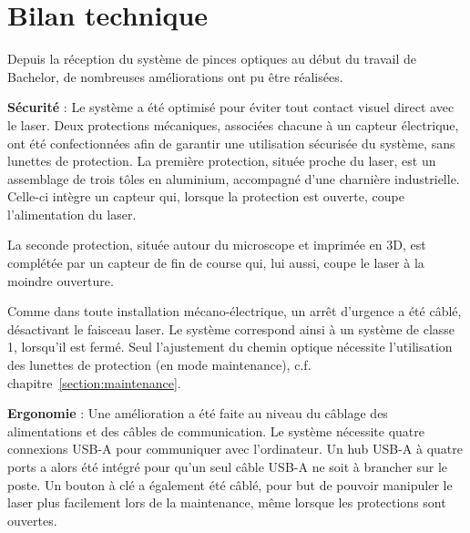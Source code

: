 

\section*{Bilan technique}
Depuis la réception du système de pinces optiques au début du travail de Bachelor, de nombreuses améliorations ont pu être réalisées.

\textbf{Sécurité} :
Le système a été optimisé pour éviter tout contact visuel direct avec le laser. Deux protections mécaniques, associées chacune à un capteur électrique, ont été confectionnées afin de garantir une utilisation sécurisée du système, sans lunettes de protection. La première protection, située proche du laser, est un assemblage de trois tôles en aluminium, accompagné d'une charnière industrielle. Celle-ci intègre un capteur qui, lorsque la protection est ouverte, coupe l'alimentation du laser.

La seconde protection, située autour du microscope et imprimée en 3D, est complétée par un capteur de fin de course qui, lui aussi, coupe le laser à la moindre ouverture.

Comme dans toute installation mécano-électrique, un arrêt d'urgence a été câblé, désactivant le faisceau laser. Le système correspond ainsi à un système de classe 1, lorsqu'il est fermé. Seul l'ajustement du chemin optique nécessite l'utilisation des lunettes de protection (en mode maintenance), c.f. chapitre~\ref{section:maintenance}.

\textbf{Ergonomie} :
Une amélioration a été faite au niveau du câblage des alimentations et des câbles de communication. Le système nécessite quatre connexions USB-A pour communiquer avec l'ordinateur. Un hub USB-A à quatre ports a alors été intégré pour qu'un seul câble USB-A ne soit à brancher sur le poste. Un bouton à clé a également été câblé, pour but de pouvoir manipuler le laser plus facilement lors de la maintenance, même lorsque les protections sont ouvertes.

